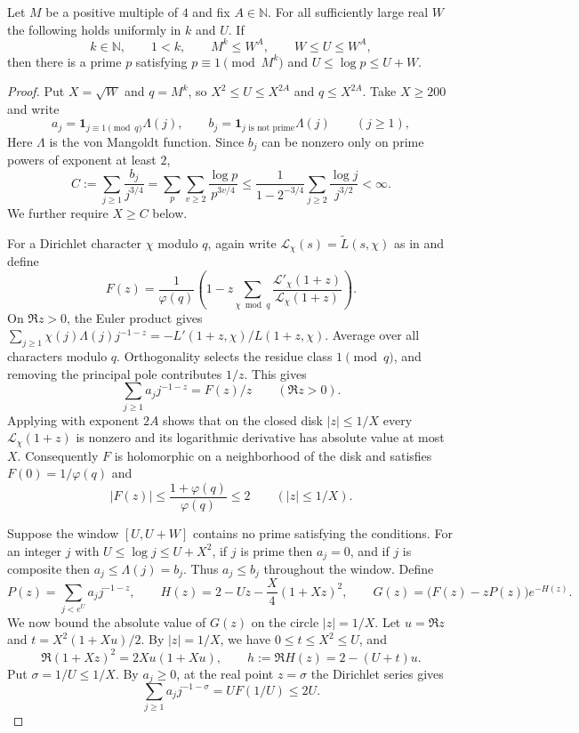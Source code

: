 \begin{lemma}
\label{lem:prime-window}
\emitthmsource
Let $M$ be a positive multiple of $4$ and fix $A\in\mathbb N$. For all sufficiently large real $W$ the following holds uniformly in $k$ and $U$. If
\[
 k\in\mathbb N,\qquad 1<k,\qquad
 M^k\le W^A,\qquad W\le U\le W^A,
\]
then there is a prime $p$ satisfying $p\equiv1\pmod{M^k}$ and $U\le\log p\le U+W$.
\end{lemma}

\begin{proof}
Put $X=\sqrt W$ and $q=M^k$, so $X^2\le U\le X^{2A}$ and $q\le X^{2A}$. Take $X\ge200$ and write
\[
 a_j=\mathbf1_{j\equiv1\pmod q}\Lambda(j),\qquad
 b_j=\mathbf1_{j\text{ is not prime}}\Lambda(j)
 \qquad(j\ge1),
\]
Here $\Lambda$ is the von Mangoldt function. Since $b_j$ can be nonzero only on prime powers of exponent at least $2$,
\[
 C:=\sum_{j\ge1}\frac{b_j}{j^{3/4}}
   =\sum_p\sum_{v\ge2}\frac{\log p}{p^{3v/4}}
   \le\frac{1}{1-2^{-3/4}}\sum_{j\ge2}\frac{\log j}{j^{3/2}}
   <\infty .
\]
We further require $X\ge C$ below.

For a Dirichlet character $\chi$ modulo $q$, again write $\mathcal L_\chi(s)=\widetilde L(s,\chi)$ as in  and define
\[
 F(z)=\frac{1}{\varphi(q)}
      \left(1-z\sum_{\chi\bmod q}
        \frac{\mathcal L'_\chi(1+z)}{\mathcal L_\chi(1+z)}\right).
\]
On $\Re z>0$, the Euler product gives $\sum_{j\ge1}\chi(j)\Lambda(j)j^{-1-z}=-L'(1+z,\chi)/L(1+z,\chi)$.
Average over all characters modulo $q$. Orthogonality selects the residue class $1\pmod q$, and removing the principal pole contributes $1/z$. This gives
\[
 \sum_{j\ge1}a_j j^{-1-z}=F(z)/z \qquad(\Re z>0).
\]
Applying  with exponent $2A$ shows that on the closed disk $|z|\le1/X$ every $\mathcal L_\chi(1+z)$ is nonzero and its logarithmic derivative has absolute value at most $X$. Consequently $F$ is holomorphic on a neighborhood of the disk and satisfies $F(0)=1/\varphi(q)$ and
\[
 |F(z)|\le\frac{1+\varphi(q)}{\varphi(q)}\le2
 \qquad (|z|\le1/X).
\]

Suppose the window $[U,U+W]$ contains no prime satisfying the conditions. For an integer $j$ with $U\le\log j\le U+X^2$, if $j$ is prime then $a_j=0$, and if $j$ is composite then $a_j\le\Lambda(j)=b_j$. Thus $a_j\le b_j$ throughout the window. Define
\[
 P(z)=\sum_{j<e^U}a_j j^{-1-z},\qquad
 H(z)=2-Uz-\frac X4(1+Xz)^2,\qquad
 G(z)=\bigl(F(z)-zP(z)\bigr)e^{-H(z)}.
\]
We now bound the absolute value of $G(z)$ on the circle $|z|=1/X$.
Let $u=\Re z$ and $t=X^2(1+Xu)/2$. By $|z|=1/X$, we have $0\le t\le X^2\le U$, and
\[
 \Re(1+Xz)^2=2Xu(1+Xu),\qquad
 h:=\Re H(z)=2-(U+t)u .
\]
Put $\sigma=1/U\le1/X$. By $a_j\ge0$, at the real point $z=\sigma$ the Dirichlet series gives
\[
 \sum_{j\ge1} a_j j^{-1-\sigma}
   =U F(1/U)\le2U .
\]


\end{proof}
